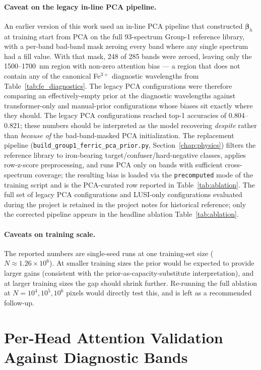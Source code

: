 \documentclass[11pt]{report}
\begin{document}
\paragraph{Caveat on the legacy in-line PCA pipeline.}
\label{sec:pca_legacy_caveat}
An earlier version of this work used an in-line PCA pipeline that constructed $\bm{\beta}_h$ at training start from PCA on the full 93-spectrum Group-1 reference library, with a per-band bad-band mask zeroing every band where any single spectrum had a fill value. With that mask, 248 of 285 bands were zeroed, leaving only the 1500--1700~nm region with non-zero attention bias --- a region that does not contain any of the canonical Fe$^{3+}$ diagnostic wavelengths from Table~\ref{tab:fe_diagnostics}. The legacy PCA configurations were therefore comparing an effectively-empty prior at the diagnostic wavelengths against transformer-only and manual-prior configurations whose biases sit exactly where they should. The legacy PCA configurations reached top-1 accuracies of 0.804--0.821; these numbers should be interpreted as the model recovering \emph{despite} rather than \emph{because of} the bad-band-masked PCA initialization. The replacement pipeline (\texttt{build\_group1\_ferric\_pca\_prior.py}, Section~\ref{chap:physics}) filters the reference library to iron-bearing target/confuser/hard-negative classes, applies row-z-score preprocessing, and runs PCA only on bands with sufficient cross-spectrum coverage; the resulting bias is loaded via the \texttt{precomputed} mode of the training script and is the PCA-curated row reported in Table~\ref{tab:ablation}. The full set of legacy PCA configurations and LUSI-only configurations evaluated during the project is retained in the project notes for historical reference; only the corrected pipeline appears in the headline ablation Table~\ref{tab:ablation}.

\paragraph{Caveats on training scale.}
The reported numbers are single-seed runs at one training-set size ($N \approx 1.26 \times 10^{6}$). At smaller training sizes the prior would be expected to provide larger gains (consistent with the prior-as-capacity-substitute interpretation), and at larger training sizes the gap should shrink further. Re-running the full ablation at $N = 10^4, 10^5, 10^6$ pixels would directly test this, and is left as a recommended follow-up.

\section{Per-Head Attention Validation Against Diagnostic Bands}
\end{document}
